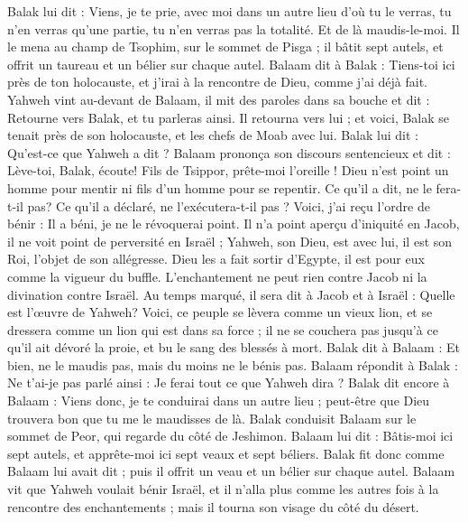 \begin{multicols}{2}
Balak lui dit : Viens, je te prie, avec moi dans un autre lieu d'où tu le verras, tu n'en verras qu'une partie, tu n'en verras pas la totalité. Et de là maudis-le-moi.
Il le mena au champ de Tsophim, sur le sommet de Pisga ; il bâtit sept autels, et offrit un taureau et un bélier sur chaque autel.
Balaam dit à Balak : Tiens-toi ici près de ton holocauste, et j'irai à la rencontre de Dieu, comme j'ai déjà fait.
Yahweh vint au-devant de Balaam, il mit des paroles dans sa bouche et dit : Retourne vers Balak, et tu parleras ainsi.
Il retourna vers lui ; et voici, Balak se tenait près de son holocauste, et les chefs de Moab avec lui. Balak lui dit : Qu'est-ce que Yahweh a dit ?
Balaam prononça son discours sentencieux et dit : Lève-toi, Balak, écoute! Fils de Tsippor, prête-moi l'oreille !
Dieu n'est point un homme pour mentir ni fils d'un homme pour se repentir. Ce qu'il a dit, ne le fera-t-il pas? Ce qu'il a déclaré, ne l'exécutera-t-il pas ?
Voici, j'ai reçu l'ordre de bénir : Il a béni, je ne le révoquerai point.
Il n'a point aperçu d'iniquité en Jacob, il ne voit point de perversité en Israël ; Yahweh, son Dieu, est avec lui, il est son Roi, l'objet de son allégresse.
Dieu les a fait sortir d'Egypte, il est pour eux comme la vigueur du buffle.
L'enchantement ne peut rien contre Jacob ni la divination contre Israël. Au temps marqué, il sera dit à Jacob et à Israël : Quelle est l'œuvre de Yahweh?
Voici, ce peuple se lèvera comme un vieux lion, et se dressera comme un lion qui est dans sa force ; il ne se couchera pas jusqu'à ce qu'il ait dévoré la proie, et bu le sang des blessés à mort.
Balak dit à Balaam : Et bien, ne le maudis pas, mais du moins ne le bénis pas.
Balaam répondit à Balak : Ne t'ai-je pas parlé ainsi : Je ferai tout ce que Yahweh dira ?
Balak dit encore à Balaam : Viens donc, je te conduirai dans un autre lieu ; peut-être que Dieu trouvera bon que tu me le maudisses de là.
Balak conduisit Balaam sur le sommet de Peor, qui regarde du côté de Jeshimon.
Balaam lui dit : Bâtis-moi ici sept autels, et apprête-moi ici sept veaux et sept béliers.
Balak fit donc comme Balaam lui avait dit ; puis il offrit un veau et un bélier sur chaque autel.
\VerseOne{}Balaam vit que Yahweh voulait bénir Israël, et il n'alla plus comme les autres fois à la rencontre des enchantements ; mais il tourna son visage du côté du désert.

\end{multicols}

